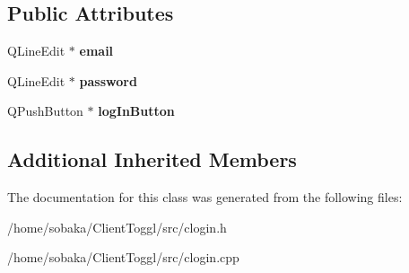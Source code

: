 \subsection*{Public Attributes}
\begin{DoxyCompactItemize}
\item 
\mbox{\label{classCLogin_aa4c5632c5f082a698f7e563e75272b60}} 
Q\+Line\+Edit $\ast$ {\bfseries email}
\item 
\mbox{\label{classCLogin_a27c0616428c2f51312dd8dfa3542c015}} 
Q\+Line\+Edit $\ast$ {\bfseries password}
\item 
\mbox{\label{classCLogin_afb3a148e141ad6c80c2834e48d8e01dc}} 
Q\+Push\+Button $\ast$ {\bfseries log\+In\+Button}
\end{DoxyCompactItemize}
\subsection*{Additional Inherited Members}


The documentation for this class was generated from the following files\+:\begin{DoxyCompactItemize}
\item 
/home/sobaka/\+Client\+Toggl/src/clogin.\+h\item 
/home/sobaka/\+Client\+Toggl/src/clogin.\+cpp\end{DoxyCompactItemize}
